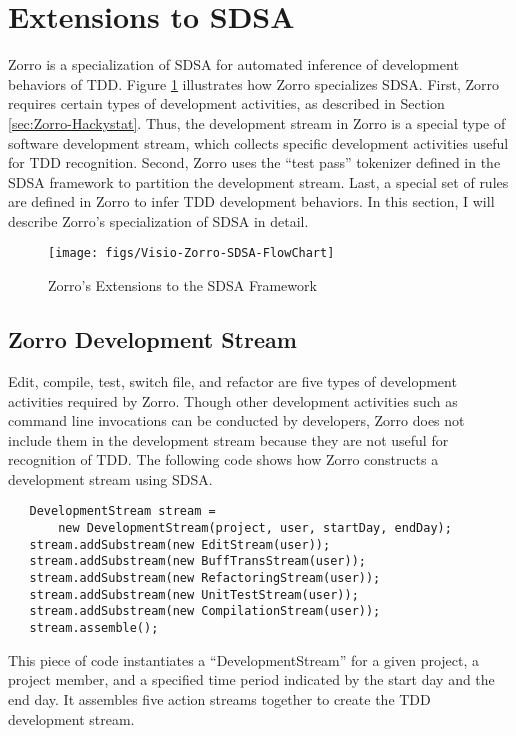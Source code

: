 \section{Extensions to SDSA}
Zorro is a specialization of SDSA for automated inference of 
development behaviors of TDD. Figure \ref{fig:Zorro-SDSA-Workflow} 
illustrates how Zorro specializes SDSA. First, Zorro requires 
certain types of development activities, as described in 
Section \ref{sec:Zorro-Hackystat}. Thus, the development 
stream in Zorro is a special type of software development stream, which 
collects specific development activities useful for TDD recognition.
Second, Zorro uses the ``test pass'' tokenizer defined in the SDSA 
framework to partition the development stream. Last, a special set 
of rules are defined in Zorro to infer TDD development behaviors. In 
this section, I will describe Zorro's specialization of SDSA in detail.
\begin{figure}[htbp]
  \centering
  \texttt{[image: figs/Visio-Zorro-SDSA-FlowChart]}
  \caption{Zorro's Extensions to the SDSA Framework}
  \label{fig:Zorro-SDSA-Workflow}
\end{figure}

\subsection{Zorro Development Stream}
Edit, compile, test, switch file, and refactor are five types
of development activities required by Zorro. Though other 
development activities such as command line invocations can be 
conducted by developers, Zorro does not include them in
the development stream because they are not useful for 
recognition of TDD. The following code shows how Zorro 
constructs a development stream using SDSA. 
\begin{verbatim}
   DevelopmentStream stream = 
       new DevelopmentStream(project, user, startDay, endDay);
   stream.addSubstream(new EditStream(user));
   stream.addSubstream(new BuffTransStream(user));
   stream.addSubstream(new RefactoringStream(user));
   stream.addSubstream(new UnitTestStream(user));
   stream.addSubstream(new CompilationStream(user));
   stream.assemble(); 
\end{verbatim}
This piece of code instantiates a ``DevelopmentStream'' 
for a given project, a project member, and a specified time 
period indicated by the start day and the end day. It assembles
five action streams together to create the TDD development 
stream. 

